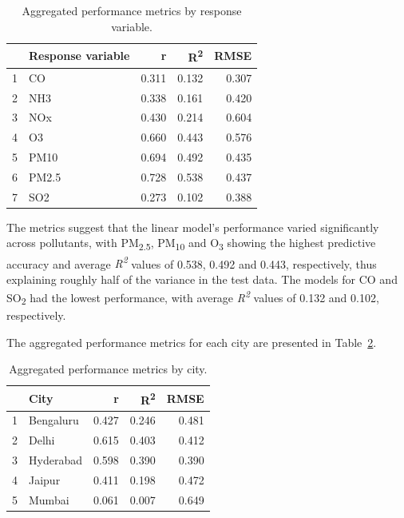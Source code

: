 \documentclass[twoside,11pt]{article}
\begin{document}
\begin{table}[ht]
\centering
\begin{tabular}{rlrrr}
  \hline
  & Response variable & r & R\textsuperscript{2} & RMSE \\
  \hline
  1 & CO & 0.311 & 0.132 & 0.307 \\ 
  2 & NH3 & 0.338 & 0.161 & 0.420 \\ 
  3 & NOx & 0.430 & 0.214 & 0.604 \\ 
  4 & O3 & 0.660 & 0.443 & 0.576 \\ 
  5 & PM10 & 0.694 & 0.492 & 0.435 \\ 
  6 & PM2.5 & 0.728 & 0.538 & 0.437 \\ 
  7 & SO2 & 0.273 & 0.102 & 0.388 \\ 
    \hline
\end{tabular}
\caption{Aggregated performance metrics by response variable.}
\label{tab:performance_metrics_by_variable}
\end{table}

The metrics suggest that the linear model's performance varied significantly across pollutants, with PM\textsubscript{2.5}, PM\textsubscript{10} and O\textsubscript{3} showing the highest predictive accuracy and average \textit{R\textsuperscript{2}} values of 0.538, 0.492 and 0.443, respectively, thus explaining roughly half of the variance in the test data. The models for CO and SO\textsubscript{2} had the lowest performance, with average \textit{R\textsuperscript{2}} values of 0.132 and 0.102, respectively.

The aggregated performance metrics for each city are presented in Table~\ref{tab:performance_metrics_by_city}.

\begin{table}[ht]
\centering
\begin{tabular}{rlrrr}
  \hline
  & City & r & R\textsuperscript{2} & RMSE \\
  \hline
1 & Bengaluru & 0.427 & 0.246 & 0.481 \\ 
  2 & Delhi & 0.615 & 0.403 & 0.412 \\ 
  3 & Hyderabad & 0.598 & 0.390 & 0.390 \\ 
  4 & Jaipur & 0.411 & 0.198 & 0.472 \\ 
  5 & Mumbai & 0.061 & 0.007 & 0.649 \\ 
    \hline
\end{tabular}
\caption{Aggregated performance metrics by city.}
\label{tab:performance_metrics_by_city}
\end{table}
\end{document}
